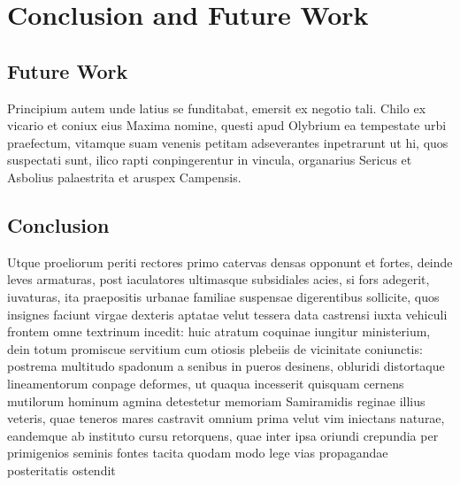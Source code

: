\chapter{Conclusion and Future Work}
\label{chap:conclusion}
\section{Future Work}
Principium autem unde latius se funditabat, emersit ex negotio tali. Chilo ex vicario et coniux eius Maxima nomine, questi apud Olybrium ea tempestate urbi praefectum, vitamque suam venenis petitam adseverantes inpetrarunt ut hi, quos suspectati sunt, ilico rapti conpingerentur in vincula, organarius Sericus et Asbolius palaestrita et aruspex Campensis.

\section{Conclusion}
Utque proeliorum periti rectores primo catervas densas opponunt et fortes, deinde leves armaturas, post iaculatores ultimasque subsidiales acies, si fors adegerit, iuvaturas, ita praepositis urbanae familiae suspensae digerentibus sollicite, quos insignes faciunt virgae dexteris aptatae velut tessera data castrensi iuxta vehiculi frontem omne textrinum incedit: huic atratum coquinae iungitur ministerium, dein totum promiscue servitium cum otiosis plebeiis de vicinitate coniunctis: postrema multitudo spadonum a senibus in pueros desinens, obluridi distortaque lineamentorum conpage deformes, ut quaqua incesserit quisquam cernens mutilorum hominum agmina detestetur memoriam Samiramidis reginae illius veteris, quae teneros mares castravit omnium prima velut vim iniectans naturae, eandemque ab instituto cursu retorquens, quae inter ipsa oriundi crepundia per primigenios seminis fontes tacita quodam modo lege vias propagandae posteritatis ostendit